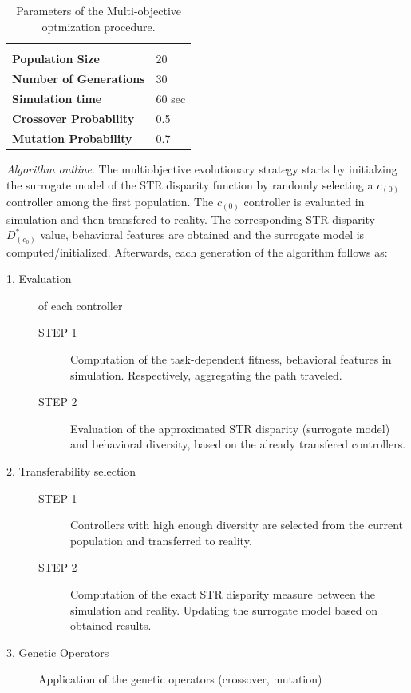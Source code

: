 \begin{table}[H]
\centering
\begin{tabular}{ll}
\hline
\textbf{}                      & \textbf{} \\ \hline
\textbf{Population Size}       & 20        \\
\textbf{Number of Generations} & 30        \\
\textbf{Simulation time}       & 60 sec    \\
\textbf{Crossover Probability}             & 0.5      \\
\textbf{Mutation Probability}              & 0.7       \\
\end{tabular}
\caption{Parameters of the Multi-objective optmization procedure.}
\label{tab:moea_parameters}
\end{table}


\emph{Algorithm outline}. The multiobjective evolutionary strategy starts by initialzing the surrogate model of the STR disparity function by randomly selecting a $c_{(0)}$ controller among the first population. The $c_{(0)}$ controller is evaluated in simulation and then transfered to reality. The corresponding STR disparity $ D^{*}_{(c_0)}$ value, behavioral features are obtained and the surrogate model is computed/initialized. Afterwards, each generation of the algorithm follows as:

\begin{description}
	\item[1. Evaluation] of each controller
		\begin{description}
			\item[STEP 1] Computation of the task-dependent fitness, behavioral features in simulation. Respectively, aggregating the path traveled.
			\item[STEP 2] Evaluation of the approximated STR disparity (surrogate model) and behavioral diversity, based on the already transfered controllers.
		\end{description}
	\item[2. Transferability selection] 
		\begin{description}
			\item[STEP 1] Controllers with high enough diversity are selected from the current population and transferred to reality.
			\item[STEP 2] Computation of the exact STR disparity measure between the simulation and reality. Updating the surrogate model based on obtained results.
		\end{description}
	\item[3. Genetic Operators] Application of the genetic operators (crossover, mutation)
\end{description}


